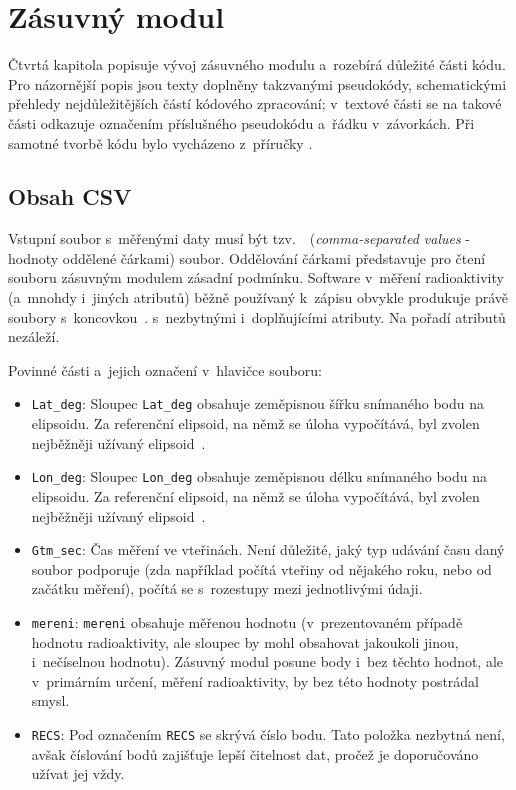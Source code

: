 \chapter{Zásuvný modul}
\label{4-plugin}

Čtvrtá kapitola popisuje vývoj zásuvného modulu a~rozebírá důležité části kódu.
Pro názornější popis jsou texty doplněny takzvanými pseudokódy,
schematickými přehledy nejdůležitějších částí kódového zpracování;
v~textové části se na takové části odkazuje označením příslušného pseudokódu a~řádku v~závorkách.  
Při samotné tvorbě kódu bylo vycházeno z~příručky \citep{cookbook}.

\section{Obsah CSV}
\label{obsah}

Vstupní soubor s~měřenými daty musí být tzv.~~(\textit{comma-separated values} - hodnoty oddělené
čárkami) soubor. Oddělování čárkami představuje pro čtení souboru zásuvným modulem zásadní podmínku.
Software v~měření radioaktivity (a~mnohdy i~jiných atributů) běžně používaný k~zápisu obvykle
produkuje právě soubory s~koncovkou~. s~nezbytnými i~doplňujícími atributy. Na pořadí
atributů nezáleží. 

Povinné části a~jejich označení v~hlavičce souboru: 
\begin{itemize}
	
	\item {\tt Lat\_deg}: Sloupec {\tt Lat\_deg} obsahuje zeměpisnou šířku snímaného bodu na elipsoidu.
	Za referenční elipsoid, na němž se úloha vypočítává, byl zvolen nejběžněji užívaný
	elipsoid~. 
	
	\item {\tt Lon\_deg}: Sloupec {\tt Lon\_deg} obsahuje zeměpisnou délku snímaného bodu na elipsoidu.
	Za referenční elipsoid, na němž se úloha vypočítává, byl zvolen nejběžněji užívaný
	elipsoid~. 
	
	\item {\tt Gtm\_sec}: Čas měření ve vteřinách. Není důležité, jaký typ udávání času daný soubor
	podporuje (zda například počítá vteřiny od nějakého roku, nebo od začátku měření), počítá
	se s~rozestupy mezi jednotlivými údaji. 
	
	\item {\tt mereni}: {\tt mereni} obsahuje měřenou hodnotu (v~prezentovaném případě hodnotu
	radioaktivity, ale sloupec by mohl obsahovat jakoukoli jinou, i~nečíselnou hodnotu). Zásuvný modul
	posune body i~bez těchto hodnot, ale v~primárním určení, měření
	radioaktivity, by bez této hodnoty postrádal smysl.
	
	\item {\tt RECS}: Pod označením {\tt RECS} se skrývá číslo bodu. Tato položka nezbytná není, avšak
	číslování bodů zajišťuje lepší čitelnost dat, pročež je doporučováno užívat jej vždy. 

\end{itemize}

